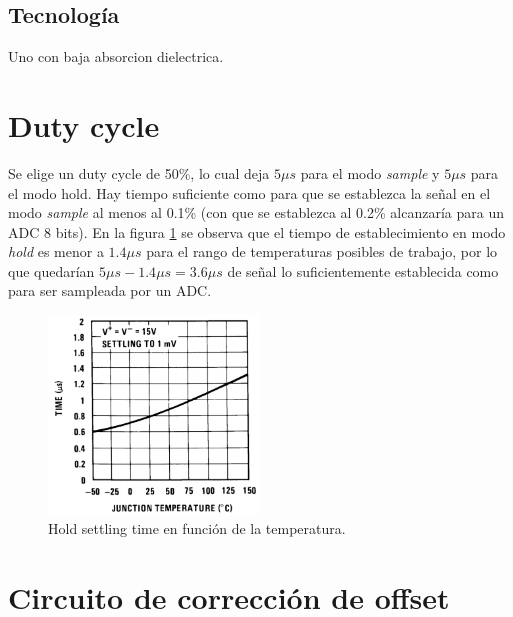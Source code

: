 \documentclass[../../ASSD_TP1_G7.tex]{subfiles}
\begin{document}
\subsection{Tecnolog\'ia}
Uno con baja absorcion dielectrica.


\section{Duty cycle}
Se elige un duty cycle de 50\%, lo cual deja $5 \mu s$ para el modo \textit{sample} y $5 \mu s$ para el modo hold. Hay tiempo suficiente como para que se establezca la se\~nal en el modo \textit{sample} al menos al 0.1\% (con que se establezca al 0.2\% alcanzar\'ia para un ADC 8 bits). En la figura \ref{fig:syh_hold_settling_time_datasheet} se observa que el tiempo de establecimiento en modo \textit{hold} es menor a $1.4\mu s$ para el rango de temperaturas posibles de trabajo, por lo que quedar\'ian $5\mu s - 1.4 \mu s = 3.6 \mu s$ de se\~nal lo suficientemente establecida como para ser sampleada por un ADC.

		\begin{figure}[H]
			\centering
			\includegraphics[width = 0.5\textwidth]{figures/hold_settling_time_datasheet.png}
			\caption{Hold settling time en funci\'on de la temperatura.}
			\label{fig:syh_hold_settling_time_datasheet}
		\end{figure}


\section{Circuito de correcci\'on de offset} \label{sec:syh_correccion_offset}
\end{document}
